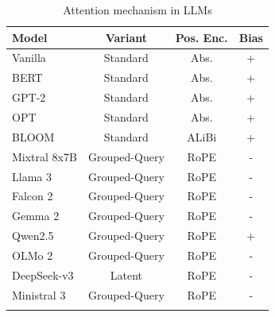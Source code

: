 \documentclass[namedate,webpdf,imanum]{ima-authoring-template}
\numberwithin{equation}{section}
\begin{document}
\begin{table}[th]
\caption{Attention mechanism in LLMs}
\label{tab:LLM-ATTN}
\begin{tabular}{@{}lccc@{}}
\toprule
Model & Variant & Pos. Enc. & Bias  \\
\midrule
Vanilla \citep{vaswani2017attention}  & Standard      & Abs.  & + \\
BERT \citep{devlin2019bert}           & Standard      & Abs.  & + \\
GPT-2 \citep{radford2019language}     & Standard      & Abs.  & + \\
OPT \citep{zhang2022opt}              & Standard      & Abs.  & + \\
BLOOM \citep{scao2022bloom}           & Standard      & ALiBi & + \\
Mixtral 8x7B \citep{jiang2024mixtral} & Grouped-Query & RoPE  & - \\
Llama 3 \citep{grattafiori2024llama}  & Grouped-Query & RoPE  & - \\
Falcon 2 \citep{malartic2024falcon2}  & Grouped-Query & RoPE  & - \\
Gemma 2 \citep{riviere2024gemma}      & Grouped-Query & RoPE  & - \\
Qwen2.5 \citep{yang2024qwen25}        & Grouped-Query & RoPE  & + \\
OLMo 2 \citep{walsh20252}             & Grouped-Query & RoPE  & - \\
DeepSeek-v3 \citep{liu2024deepseek}   & Latent        & RoPE  & - \\
Ministral 3 \citep{liu2026mistral}    & Grouped-Query & RoPE  & - \\
\botrule
\end{tabular}
\end{table}
\end{document}
